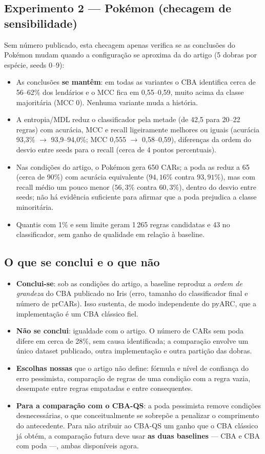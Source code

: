 \documentclass[a4paper,11pt]{article}
\begin{document}
\subsection{Experimento 2 --- Pokémon (checagem de sensibilidade)}
Sem número publicado, esta checagem apenas verifica se as conclusões do Pokémon mudam quando a configuração se aproxima da do artigo (5 dobras por espécie, seeds 0--9):

\begin{itemize}
  \item As conclusões \textbf{se mantêm}: em todas as variantes o CBA identifica cerca de 56--62\% dos lendários e o MCC fica em 0,55--0,59, muito acima da classe majoritária (MCC 0). Nenhuma variante muda a história.
  \item A entropia/MDL reduz o classificador pela metade (de 42,5 para 20--22 regras) com acurácia, MCC e recall ligeiramente melhores ou iguais (acurácia 93,3\% $\to$ 93,9--94,0\%; MCC 0,555 $\to$ 0,58--0,59), diferenças da ordem do desvio entre seeds para o recall (cerca de 4 pontos percentuais).
  \item Nas condições do artigo, o Pokémon gera 650 CARs; a poda as reduz a 65 (cerca de 90\%) com acurácia equivalente ($94{,}16\%$ contra $93{,}91\%$), mas com recall médio um pouco menor ($56{,}3\%$ contra $60{,}3\%$), dentro do desvio entre seeds; não há evidência suficiente para afirmar que a poda prejudica a classe minoritária.
  \item Quantis com 1\% e sem limite geram 1\,265 regras candidatas e 43 no classificador, sem ganho de qualidade em relação à baseline.
\end{itemize}

\subsection{O que se conclui e o que não}
\begin{itemize}
  \item \textbf{Conclui-se}: sob as condições do artigo, a baseline reproduz a \emph{ordem de grandeza} do CBA publicado no Iris (erro, tamanho do classificador final e número de prCARs). Isso sustenta, de modo independente do pyARC, que a implementação é um CBA clássico fiel.
  \item \textbf{Não se conclui}: igualdade com o artigo. O número de CARs sem poda difere em cerca de 28\%, sem causa identificada; a comparação envolve um único dataset publicado, outra implementação e outra partição das dobras.
  \item \textbf{Escolhas nossas} que o artigo não define: fórmula e nível de confiança do erro pessimista, comparação de regras de uma condição com a regra vazia, desempate entre regras empatadas e entre consequentes.
  \item \textbf{Para a comparação com o CBA-QS}: a poda pessimista remove condições desnecessárias, o que conceitualmente se sobrepõe a penalizar o comprimento do antecedente. Para não atribuir ao CBA-QS um ganho que o CBA clássico já obtém, a comparação futura deve usar \textbf{as duas baselines} --- CBA e CBA com poda ---, ambas disponíveis agora.
\end{itemize}
\end{document}
